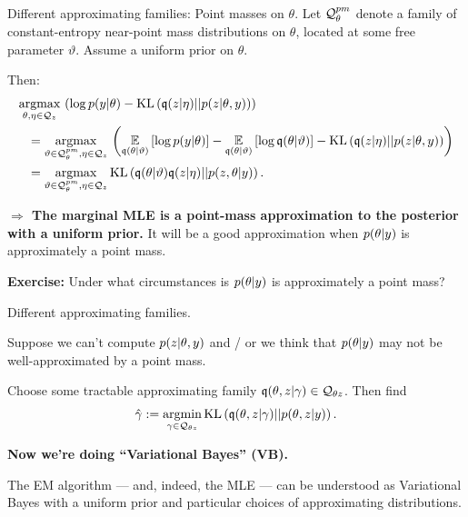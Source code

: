 \begin{frame}{Different approximating families: Point masses on $\theta$.}
%
Let $\mathcal{Q}_{\theta}^{pm}$ denote a family of constant-entropy near-point mass
distributions on $\theta$, located at some free parameter $\vartheta$. Assume a
uniform prior on $\theta$.

\pause

Then:
%
\begin{align*}
%
\MoveEqLeft
\argmax{\theta, \eta \in \qdom_\z}
\left(
\log p(\y | \theta) -
    \kl{\q(\z | \eta)}{p(\z | \theta, \y)}  \right)
\\={}&
%
\argmax{\vartheta \in \qdom_{\theta}^{pm}, \eta \in \qdom_\z}
\left(
\expect{\q(\theta \vert \vartheta)}{\log p(\y | \theta)} -
\expect{\q(\theta \vert \vartheta)}{\log \q(\theta | \vartheta)} -
    \kl{\q(\z | \eta)}{p(\z | \theta, \y)}
\right)
\\={}&
\argmax{\vartheta \in \qdom_{\theta}^{pm}, \eta \in \qdom_\z}
\kl{\q(\theta \vert \vartheta) \q(\z \vert \eta)}{p(\z, \theta \vert \y)}.
%
\end{align*}
%

\pause

\textbf{
$\Rightarrow$ The marginal MLE is a point-mass approximation to the
posterior with a uniform prior.}
%
It will be a good approximation when $p(\theta \vert y)$ is approximately a
point mass.

\pause

\textbf{Exercise: } Under what circumstances is $p(\theta \vert y)$ is
approximately a point mass?

\end{frame}




\begin{frame}{Different approximating families.}

Suppose we can't compute $p(z | \theta, y)$ and / or we think that
$p(\theta \vert y)$ may not be well-approximated by a point mass.

Choose some tractable approximating family $\mathfrak{q}(\theta, z \vert \gamma) \in
\mathcal{Q}_{\theta z}$.  Then find
%
\begin{align*}
%
\hat\gamma := \argmin{\gamma \in \qdom_{\theta\z}}
\kl{\q(\theta, \z \vert \gamma)}{p(\theta, \z \vert \y)}.
%
\end{align*}
%
\pause

\textbf{Now we're doing ``Variational Bayes'' (VB).}

\pause

The EM algorithm --- and, indeed, the MLE --- can be understood as Variational
Bayes with a uniform prior and particular choices of approximating
distributions.

\end{frame}


